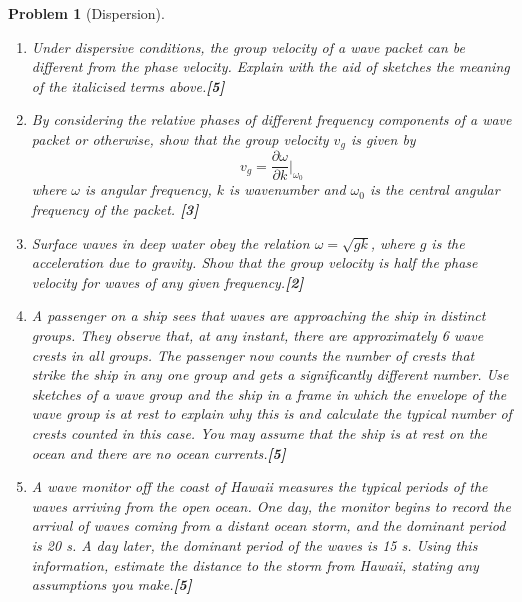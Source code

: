 \documentclass[a4paper]{article}
\theoremstyle{new}
\newtheorem{qns}{Problem}[subsection]
\begin{document}
\begin{qns}[Dispersion]\leavevmode
\begin{enumerate}[label=(\roman*)]
\item Under dispersive conditions, the \textit{group velocity} of a wave packet can be different from the \textit{phase velocity}. Explain with the aid of sketches the meaning of the italicised terms above.\hfill\textbf{[5]}
\item By considering the relative phases of different frequency components of a wave packet or otherwise, show that the group velocity $v_g$ is given by
$$v_g=\frac{\partial\omega}{\partial k}\bigg|_{\omega_0}$$
where $\omega$ is angular frequency, $k$ is wavenumber and $\omega_0$ is the central angular frequency of the packet. \hfill\textbf{[3]}
\item Surface waves in deep water obey the relation $\omega=\sqrt{gk}$, where $g$ is the acceleration due to gravity. Show that the group velocity is half the phase velocity for waves of any given frequency.\hfill\textbf{[2]}
\item A passenger on a ship sees that waves are approaching the ship in distinct groups. They observe that, at any instant, there are approximately 6 wave crests in all groups. The passenger now counts the number of crests that strike the ship in any one group and gets a significantly different number. Use sketches of a wave group and the ship in a frame in which the envelope of the wave group is at rest to explain why this is and calculate the typical number of crests counted in this case. You may assume that the ship is at rest on the ocean and there are no ocean currents.\hfill\textbf{[5]}
\item A wave monitor off the coast of Hawaii measures the typical periods of the waves arriving from the open ocean. One day, the monitor begins to record the arrival of waves coming from a distant ocean storm, and the dominant period is 20 s. A day later, the dominant period of the waves is 15 s. Using this information, estimate the distance to the storm from Hawaii, stating any assumptions you make.\hfill\textbf{[5]}
\end{enumerate}
\end{qns}
\end{document}

